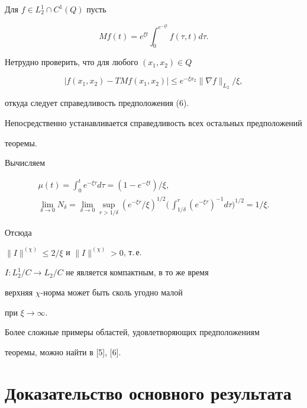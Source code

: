 Для $f\in L^1_2\cap C^1(Q)$ пусть


$$


Mf(t)=e^{\xi t}\int_0^{e^{-\xi t}}f(\tau,t)d\tau.


$$


Нетрудно проверить, что для любого $(x_1,x_2)\in Q$


$$


|f(x_1,x_2)-TMf(x_1,x_2)|\le e^{-\xi x_2}\|\nabla f\|_{L_2}/\xi,


$$


откуда следует справедливость предположения (6).


Непосредственно устанавливается справедливость всех остальных предположений


теоремы.





Вычисляем


\begin{gather*}


\mu(t)=\int_0^te^{-\xi \tau}d\tau = (1-e^{-\xi t})/\xi,\\


\lim_{\delta\to 0}N_{\delta} = \lim_{\delta\to 0}


\sup\limits_{r>1/\delta}(e^{-\xi r}/\xi)^{1/2}\biggl(\,\int_{1/\delta}^r


{(e^{-\xi \tau})}^{-1}d\tau\biggr)^{1/2}=1/\xi.


\end{gather*}


Отсюда


$\|I\|^{(\chi)}\le 2/\xi$ и $\|I\|^{(\chi)}>0$, т.\,е.


$I:L^1_2/C\to L_2/C$ не является компактным, в то же время


верхняя $\chi$-норма может быть сколь угодно малой


при $\xi\to\infty$.





Более сложные примеры областей, удовлетворяющих предположениям


теоремы, можно найти в [5], [6].





\section{Доказательство основного результата}





